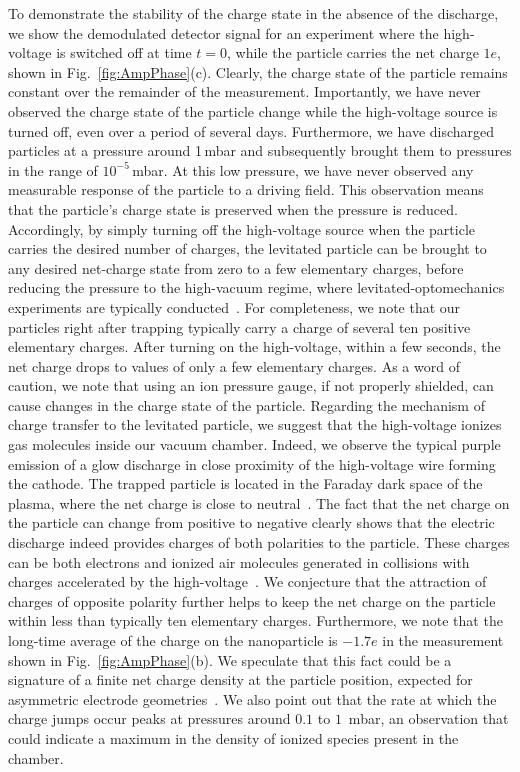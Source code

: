 \documentclass[aps,amssymb,amsmath,pra,reprint,noshowpacs]{revtex4-1}
\begin{document}
To demonstrate the stability of the charge state in the absence of the discharge, we show the demodulated detector signal for an experiment where the high-voltage is switched off at time $t=0$, while the particle carries the net charge $1e$, shown in Fig.~\ref{fig:AmpPhase}(c). Clearly, the charge state of the particle remains constant over the remainder of the measurement. Importantly, we have never observed the charge state of the particle change while the high-voltage source is turned off, even over a period of several days.
Furthermore, we have discharged particles at a pressure around 1\,mbar and subsequently brought them to pressures in the range of $10^{-5}$\,mbar.
At this low pressure, we have never observed any measurable response of the particle to a driving field.
This observation means that the particle's charge state is preserved when the pressure is reduced. Accordingly, by simply turning off the high-voltage source when the particle carries the desired number of charges, the levitated particle can be brought to any desired net-charge state from zero to a few elementary charges, before reducing the pressure to the high-vacuum regime, where levitated-optomechanics experiments are typically conducted~\cite{Jain2016}. For completeness, we note that our particles right after trapping typically carry a charge of several ten positive elementary charges. After turning on the high-voltage, within a few seconds, the net charge drops to values of only a few elementary charges.
{As a word of caution, we note that using an ion pressure gauge, if not properly shielded, can cause changes in the charge state of the particle.}
Regarding the mechanism of charge transfer to the levitated particle, we suggest that the high-voltage ionizes gas molecules inside our vacuum chamber. Indeed, we observe the typical purple emission of a glow discharge in close proximity of the high-voltage wire forming the cathode. The trapped particle is located in the Faraday dark space of the plasma, where the net charge is close to neutral~\cite{Lieberman2005}. {The fact that the net charge on the particle can change from positive to negative clearly shows that the electric discharge indeed provides charges of both polarities to the particle. These charges can be both electrons and ionized air molecules generated in collisions with charges accelerated by the high-voltage~\cite{Lieberman2005}.} We conjecture that the attraction of charges of opposite polarity further helps to keep the net charge on the particle within less than typically ten elementary charges. {Furthermore, we note that the long-time average of the charge on the nanoparticle is $-1.7e$ in the measurement shown in Fig.~\ref{fig:AmpPhase}(b). We speculate that this fact could be a signature of a finite net charge density at the particle position, expected for asymmetric electrode geometries~\cite{Bogdanov2015}.
We also point out that the rate at which the charge jumps occur peaks at pressures around $0.1$ to $1$~mbar, an observation that could indicate a maximum in the density of ionized species present in the chamber.}
\end{document}
